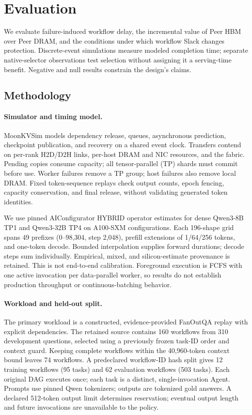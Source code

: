 \section{Evaluation}
\label{sec:evaluation}

We evaluate failure-induced workflow delay, the incremental value of Peer HBM
over Peer DRAM, and the conditions under which workflow Slack changes
protection. Discrete-event simulations measure modeled completion time;
separate native-selector observations test selection without assigning it a
serving-time benefit. Negative and null results constrain the design's claims.

\subsection{Methodology}
\label{sec:eval-method}

\paragraph{Simulator and timing model.}
MoonKVSim models dependency release, queues, asynchronous prediction,
checkpoint publication, and recovery on a shared event clock. Transfers contend
on per-rank H2D/D2H links, per-host DRAM and NIC resources, and the fabric.
Pending copies consume capacity; all tensor-parallel (TP) shards must commit
before use. Worker failures remove a TP group; host failures also remove local
DRAM. Fixed token-sequence replays check output counts, epoch fencing, capacity
conservation, and final release, without validating generated token identities.

We use pinned AIConfigurator HYBRID operator estimates\cite{eval2026aiconfigurator}
for dense Qwen3-8B TP1 and Qwen3-32B TP4 on A100-SXM configurations.
Each 196-shape grid spans 49 prefixes (0--98,304, step 2,048), prefill extensions
of 1/64/256 tokens, and one-token decode. Bounded interpolation supplies forward
durations; decode steps sum individually. Empirical, mixed, and silicon-estimate
provenance is retained. This is not end-to-end calibration. Foreground execution
is FCFS with one active invocation per data-parallel worker, so results do not
establish production throughput or continuous-batching behavior.

\paragraph{Workload and held-out split.}
The primary workload is a constructed, evidence-provided FanOutQA
replay\cite{eval2024fanoutqa} with explicit dependencies. The retained source
contains 160 workflows from 310 development questions, selected using a
previously frozen task-ID order and context guard. Keeping complete workflows
within the 40,960-token context bound leaves 74 workflows. A predeclared
workflow-ID hash split gives 12 training workflows (95 tasks) and 62 evaluation
workflows (503 tasks). Each original DAG executes once; each task is a distinct,
single-invocation Agent. Prompts use pinned Qwen tokenizers; outputs are
tokenized gold answers. A declared 512-token output limit determines reservation;
eventual output length and future invocations are unavailable to the policy.


